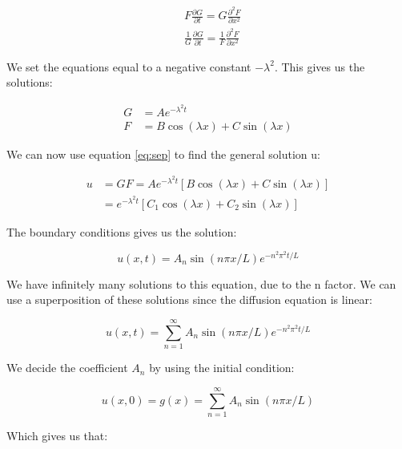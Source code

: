 \documentclass{article}
\begin{document}
\begin{equation}
\begin{split}
&F\frac{\partial G}{\partial t} = G \frac{\partial ^2 F}{\partial x^2}\\
&\frac{1}{G}\frac{\partial G}{\partial t} = \frac{1}{F} \frac{\partial^2 F}{\partial x^2}
\end{split}
\end{equation}

We set the equations equal to a negative constant $-\lambda^2$. This gives us the solutions:

\begin{equation*}
\begin{split}
G &= Ae^{-\lambda^2 t}\\
F &= B\cos{(\lambda x)} + C\sin{(\lambda x)}
\end{split}
\end{equation*} 

We can now use equation \ref{eq:sep} to find the general solution u:

\begin{equation}
\begin{split}
u &= GF = Ae^{-\lambda^2 t} [B\cos{(\lambda x)} + C\sin{(\lambda x)}]\\
&=e^{-\lambda^2 t} [C_1\cos{(\lambda x)} + C_2\sin{(\lambda x)}]
\end{split}
\end{equation}

The boundary conditions gives us the solution:

\begin{equation}
u(x,t) = A_n\sin{(n\pi x/L)}e^{-n^2\pi^2t/L}
\end{equation}

We have infinitely many solutions to this equation, due to the n factor. We can use a superposition of these solutions since the diffusion equation is linear:

\begin{equation}
u(x,t) = \sum_{n=1}^{\infty}A_n\sin{(n\pi x/L)}e^{-n^2\pi^2t/L}
\label{eq:u_undfA}
\end{equation}

We decide the coefficient $A_n$ by using the initial condition:

\begin{equation}
u(x,0)=g(x)=\sum_{n=1}^{\infty}A_n\sin{(n\pi x/L)}
\end{equation}

Which gives us that:
\end{document}
